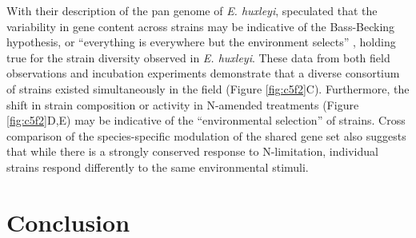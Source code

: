 With their description of the pan genome of \textit{E. huxleyi}, \citet{Read2013} speculated that the variability in gene content across strains may be indicative of the Bass-Becking hypothesis, or ``everything is everywhere but the environment selects'' \citep{Baas-Becking1934, DeWit2006}, holding true for the strain diversity observed in \textit{E. huxleyi}.  These data from both field observations and incubation experiments demonstrate that a diverse consortium of strains existed simultaneously in the field (Figure \ref{fig:c5f2}C). Furthermore, the shift in strain composition or activity in N-amended treatments (Figure \ref{fig:c5f2}D,E) may be indicative of the ``environmental selection'' of strains. Cross comparison of the species-specific modulation of the shared gene set also suggests that while there is a strongly conserved response to N-limitation, individual strains respond differently to the same environmental stimuli. \par


\section{Conclusion}

